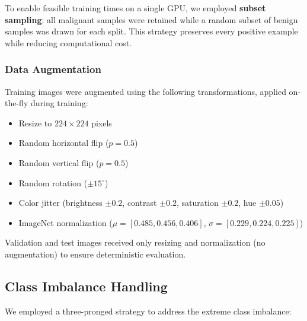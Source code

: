 \documentclass[11pt, a4paper, twocolumn]{article}
\begin{document}
To enable feasible training times on a single GPU, we employed
\textbf{subset sampling}: all malignant samples were retained while
a random subset of benign samples was drawn for each split. This
strategy preserves every positive example while reducing computational
cost.

\subsubsection{Data Augmentation}

Training images were augmented using the following transformations,
applied on-the-fly during training:

\begin{itemize}[noitemsep]
    \item Resize to $224 \times 224$ pixels
    \item Random horizontal flip ($p = 0.5$)
    \item Random vertical flip ($p = 0.5$)
    \item Random rotation ($\pm 15^{\circ}$)
    \item Color jitter (brightness $\pm 0.2$, contrast $\pm 0.2$,
          saturation $\pm 0.2$, hue $\pm 0.05$)
    \item ImageNet normalization ($\mu = [0.485, 0.456, 0.406]$,
          $\sigma = [0.229, 0.224, 0.225]$)
\end{itemize}

Validation and test images received only resizing and normalization
(no augmentation) to ensure deterministic evaluation.

\subsection{Class Imbalance Handling}
\label{subsec:imbalance}

We employed a three-pronged strategy to address the extreme class
imbalance:
\end{document}
